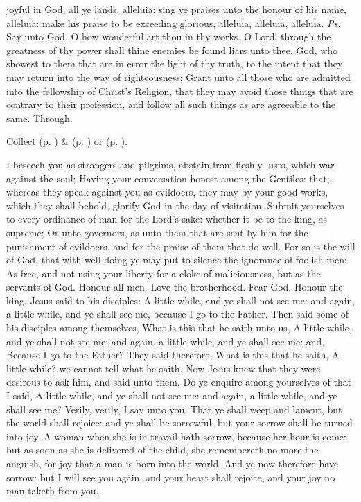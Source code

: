 \introit
{} joyful in God, all ye lands, alleluia: sing ye praises unto the honour of his name, alleluia: make his praise to be exceeding glorious, alleluia, alleluia, alleluia. \textit{Ps.} Say unto God, O how wonderful art thou in thy works, O Lord! through the greatness of thy power shall thine enemies be found liars unto thee.
\collect
{} God, who showest to them that are in error the light of thy truth, to the intent that they may return into the way of righteousness; Grant unto all those who are admitted into the fellowship of Christ's Religion, that they may avoid those things that are contrary to their profession, and follow all such things as are agreeable to the same. Through.
\begin{rubric}
     Collect  (p. \pageref{SPMaryInEaster}) \&   (p. \pageref{SPAgainst}) or  (p. \pageref{SPChiefBishop}).
\end{rubric}
 I beseech you as strangers and pilgrims, abstain from fleshly lusts, which war against the soul; Having your conversation honest among the Gentiles: that, whereas they speak against you as evildoers, they may by your good works, which they shall behold, glorify God in the day of visitation. Submit yourselves to every ordinance of man for the Lord's sake: whether it be to the king, as supreme; Or unto governors, as unto them that are sent by him for the punishment of evildoers, and for the praise of them that do well. For so is the will of God, that with well doing ye may put to silence the ignorance of foolish men: As free, and not using your liberty for a cloke of maliciousness, but as the servants of God. Honour all men. Love the brotherhood. Fear God. Honour the king.
 Jesus said to his disciples: A little while, and ye shall not see me: and again, a little while, and ye shall see me, because I go to the Father. Then said some of his disciples among themselves, What is this that he saith unto us, A little while, and ye shall not see me: and again, a little while, and ye shall see me: and, Because I go to the Father? They said therefore, What is this that he saith, A little while? we cannot tell what he saith. Now Jesus knew that they were desirous to ask him, and said unto them, Do ye enquire among yourselves of that I said, A little while, and ye shall not see me: and again, a little while, and ye shall see me? Verily, verily, I say unto you, That ye shall weep and lament, but the world shall rejoice: and ye shall be sorrowful, but your sorrow shall be turned into joy. A woman when she is in travail hath sorrow, because her hour is come: but as soon as she is delivered of the child, she remembereth no more the anguish, for joy that a man is born into the world. And ye now therefore have sorrow: but I will see you again, and your heart shall rejoice, and your joy no man taketh from you.
